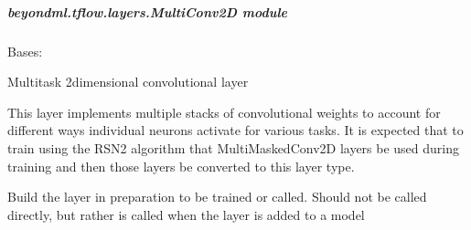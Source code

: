 \documentclass[letterpaper,10pt,english]{sphinxmanual}
\begin{document}
\subparagraph{beyondml.tflow.layers.MultiConv2D module}
\label{\detokenize{beyondml.tflow.layers:module-beyondml.tflow.layers.MultiConv2D}}\label{\detokenize{beyondml.tflow.layers:beyondml-tflow-layers-multiconv2d-module}}

\begin{fulllineitems}
\label{\detokenize{beyondml.tflow.layers:beyondml.tflow.layers.MultiConv2D.MultiConv2D}}
\pysigstartsignatures
{}
\pysigstopsignatures
\sphinxAtStartPar
Bases: 

\sphinxAtStartPar
Multitask 2\sphinxhyphen{}dimensional convolutional layer

\sphinxAtStartPar
This layer implements multiple stacks of convolutional weights to account for different ways individual
neurons activate for various tasks. It is expected that to train using the RSN2 algorithm that MultiMaskedConv2D
layers be used during training and then those layers be converted to this layer type.

\begin{fulllineitems}
\label{\detokenize{beyondml.tflow.layers:beyondml.tflow.layers.MultiConv2D.MultiConv2D.build}}
\pysigstartsignatures
{}
\pysigstopsignatures
\sphinxAtStartPar
Build the layer in preparation to be trained or called. Should not be called directly,
but rather is called when the layer is added to a model

\end{fulllineitems}



\end{fulllineitems}
\end{document}
